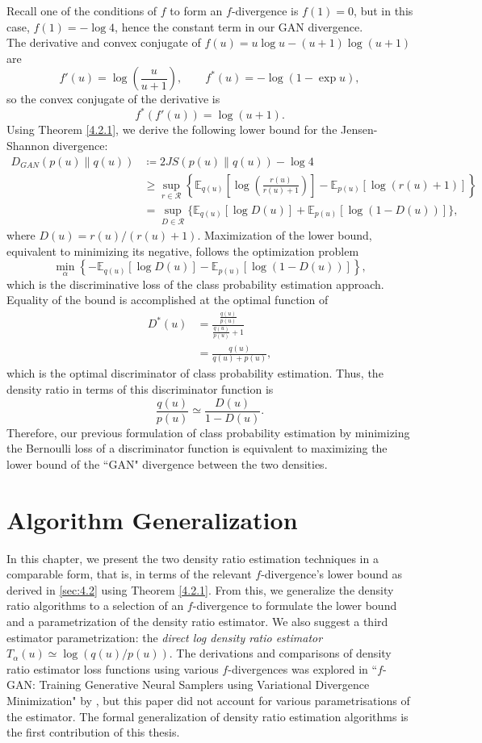 \documentclass[honours,12pt, twoside]{unswthesis}
\newcommand{\E}{\mathbb{E}}
\numberwithin{equation}{section}
\theoremstyle{definition}
\begin{document}
Recall one of the conditions of $f$ to form an $f$-divergence is $f(1)=0$, but in this case, $f(1)=-\log 4$, hence the constant term in our GAN divergence.\\
The derivative and convex conjugate of $f(u)=u\log u-(u+1)\log (u+1)$ are
\[f'(u)=\log \left(\frac{u}{u+1}\right),\qquad f^*(u)=-\log (1-\exp u),\]
so the convex conjugate of the derivative is
\[f^*(f'(u))=\log (u+1).\]
Using Theorem \ref{4.2.1}, we derive the following lower bound for the Jensen-Shannon divergence:
\begin{align*}
D_{GAN}(p(u)\|q(u))&\coloneqq 2JS(p(u)\|q(u))-\log 4\\
&\geq \sup_{r\in \mathcal{R}}\left\lbrace\mathbb{E}_{q(u)}\left[\log \left(\frac{r(u)}{r(u)+1}\right)\right]-\mathbb{E}_{p(u)}[\log(r(u)+1)]\right\rbrace\\
&=\sup_{D\in \mathcal{R}}\{\E_{q(u)}[\log D(u)]+\E_{p(u)}[\log(1-D(u))]\},
\end{align*}
where $D(u)=r(u)/(r(u)+1)$. Maximization of the lower bound, equivalent to minimizing its negative, follows the optimization problem
\[\min_\alpha \left\lbrace-\E_{q(u)}[\log D(u)]-\E_{p(u)}[\log (1-D(u))]\right\rbrace,\]
which is the discriminative loss of the class probability estimation approach. Equality of the bound is accomplished at the optimal function of
\begin{align*}
D^*(u)&=\frac{\frac{q(u)}{p(u)}}{\frac{q(u)}{p(u)}+1}\\
&=\frac{q(u)}{q(u)+p(u)},
\end{align*}
which is the optimal discriminator of class probability estimation. Thus, the density ratio in terms of this discriminator function is 
\[\frac{q(u)}{p(u)}\simeq \frac{D(u)}{1-D(u)}.\]
Therefore, our previous formulation of class probability estimation by minimizing the Bernoulli loss of a discriminator function is equivalent to maximizing the lower bound of the ``GAN" divergence between the two densities.
\chapter{Algorithm Generalization}\label{ch5}
In this chapter, we present the two density ratio estimation techniques in a comparable form, that is, in terms of the relevant $f$-divergence's lower bound as derived in \autoref{sec:4.2} using Theorem \ref{4.2.1}. From this, we generalize the density ratio algorithms to a selection of an $f$-divergence to formulate the lower bound and a parametrization of the density ratio estimator. We also suggest a third estimator parametrization: the \textit{direct log density ratio estimator} $T_\alpha(u)\simeq \log (q(u)/p(u))$. The derivations and comparisons of density ratio estimator loss functions using various $f$-divergences was explored in ``$f$-GAN: Training Generative Neural Samplers using Variational Divergence Minimization" by \citet{nowozin}, but this paper did not account for various parametrisations of the estimator. The formal generalization of density ratio estimation algorithms is the first contribution of this thesis.
\end{document}
